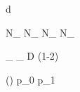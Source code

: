
\newmathsymbol{\tagdecision}     {d}
\newmathsymbol{\mistagestimate}  {\eta}
\newmathsymbol{\mistag}          {\omega}

\newmathsymbol{\Ntagged}         {N_}
\newmathsymbol{\NRtagged}        {N_}
\newmathsymbol{\NWtagged}        {N_}
\newmathsymbol{\NUtagged}        {N_}

\newmathsymbol{\tageff}          {\eps_}
\newmathsymbol{\efftageff}       {\eps_}
\newmathsymbol{\tagdilution}     {D}
\newmathsymbol{\tagdilutionlg}   {(1-2\mistag)}

\newmathsymbol{\omofeta}         {\mistag(\mistagestimate)}
\newmathsymbol{\pzero}           {p_0}
\newmathsymbol{\pone}            {p_1}
\newmathsymbol{\avgmistagestimate}{\langle\mistagestimate\rangle}